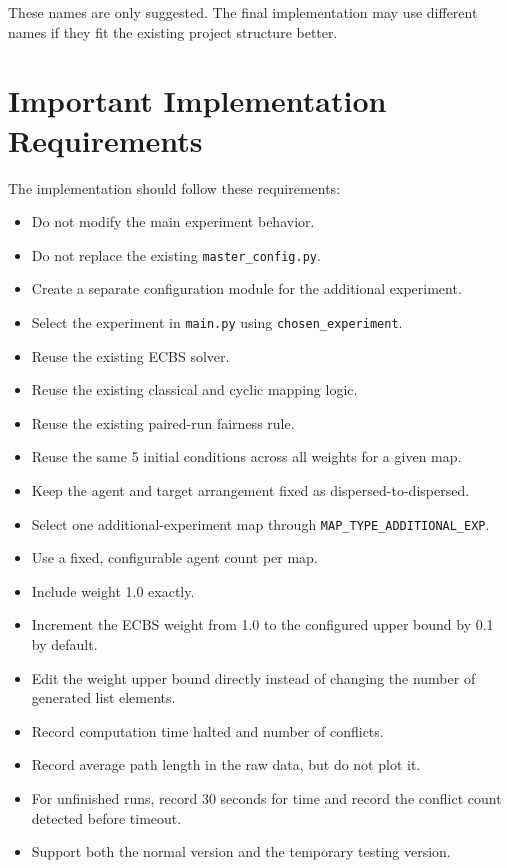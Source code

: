 \documentclass[11pt,a4paper]{article}
\begin{document}
These names are only suggested. The final implementation may use different names if they fit the existing project structure better.

\section*{Important Implementation Requirements}

The implementation should follow these requirements:

\begin{itemize}[leftmargin=2em]
    \item Do not modify the main experiment behavior.
    \item Do not replace the existing \texttt{master\_config.py}.
    \item Create a separate configuration module for the additional experiment.
    \item Select the experiment in \texttt{main.py} using \texttt{chosen\_experiment}.
    \item Reuse the existing ECBS solver.
    \item Reuse the existing classical and cyclic mapping logic.
    \item Reuse the existing paired-run fairness rule.
    \item Reuse the same 5 initial conditions across all weights for a given map.
    \item Keep the agent and target arrangement fixed as dispersed-to-dispersed.
    \item Select one additional-experiment map through \texttt{MAP\_TYPE\_ADDITIONAL\_EXP}.
    \item Use a fixed, configurable agent count per map.
    \item Include weight 1.0 exactly.
    \item Increment the ECBS weight from 1.0 to the configured upper bound by 0.1 by default.
    \item Edit the weight upper bound directly instead of changing the number of generated list elements.
    \item Record computation time halted and number of conflicts.
    \item Record average path length in the raw data, but do not plot it.
    \item For unfinished runs, record 30 seconds for time and record the conflict count detected before timeout.
    \item Support both the normal version and the temporary testing version.

\end{itemize}
\end{document}
